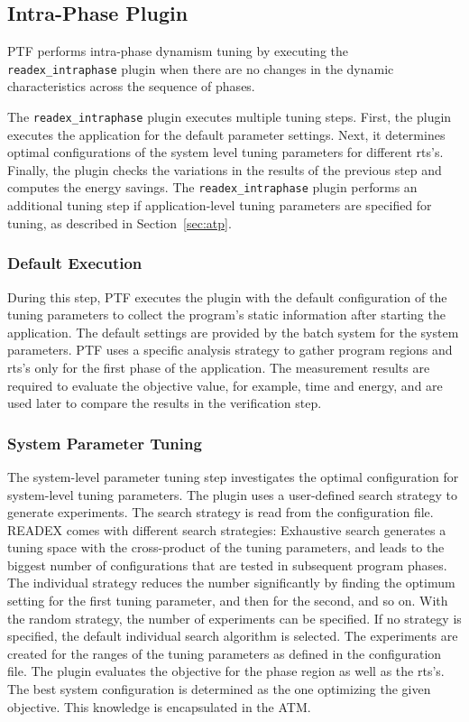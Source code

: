 \subsection{Intra-Phase Plugin} \label{sec:intra-phase}

PTF performs intra-phase dynamism tuning by executing the \linebreak\texttt{readex\_intraphase} plugin when there are no changes in the dynamic characteristics across the sequence of phases.  

The \texttt{readex\_intraphase} plugin executes multiple tuning steps. First, the plugin executes the application for the default parameter settings. Next, it determines optimal configurations of the system level tuning parameters for different rts's. Finally, the plugin checks the variations in the results of the previous step and computes the energy savings. The \texttt{readex\_intraphase} plugin performs an additional tuning step if application-level tuning parameters are specified for tuning, as described in Section~\ref{sec:atp}.

\subsubsection{Default Execution} \label{intra-default-execution} 

During this step, PTF executes the plugin with the default configuration of the tuning parameters to collect the program's static information after starting the application. The default settings are provided by the batch system for the system parameters. PTF uses a specific analysis strategy to gather program regions and rts's only for the first phase of the application. The measurement results are required to evaluate the objective value, for example, time and energy, and are used later to compare the results in the verification step.

\subsubsection{System Parameter Tuning} \label{sys-tuning} 

The system-level parameter tuning step investigates the optimal configuration for system-level tuning parameters. The plugin uses a user-defined search strategy to generate experiments. The search strategy is read from the configuration file. READEX comes with different search strategies: Exhaustive search generates a tuning space with the cross-product of the tuning parameters, and leads to the biggest number of configurations that are tested in subsequent program phases. The individual strategy reduces the number significantly by finding the optimum setting for the first tuning parameter, and then for the second, and so on. With the random strategy, the number of experiments can be specified. If no strategy is specified, the default individual search algorithm is selected. The experiments are created for the ranges of the tuning parameters as defined in the configuration file. The plugin evaluates the objective for the phase region as well as the rts's. The best system configuration is determined as the one optimizing the given objective. This knowledge is encapsulated in the ATM. 

